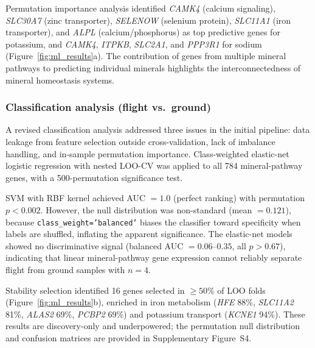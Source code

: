 \documentclass[11pt,a4paper]{article}
\begin{document}
Permutation importance analysis identified \textit{CAMK4} (calcium signaling), \textit{SLC30A7} (zinc transporter), \textit{SELENOW} (selenium protein), \textit{SLC11A1} (iron transporter), and \textit{ALPL} (calcium/phosphorus) as top predictive genes for potassium, and \textit{CAMK4}, \textit{ITPKB}, \textit{SLC2A1}, and \textit{PPP3R1} for sodium (Figure~\ref{fig:ml_results}a). The contribution of genes from multiple mineral pathways to predicting individual minerals highlights the interconnectedness of mineral homeostasis systems.

\subsubsection{Classification analysis (flight vs.\ ground)}

A revised classification analysis addressed three issues in the initial pipeline: data leakage from feature selection outside cross-validation, lack of imbalance handling, and in-sample permutation importance. Class-weighted elastic-net logistic regression with nested LOO-CV was applied to all 784 mineral-pathway genes, with a 500-permutation significance test.

SVM with RBF kernel achieved AUC $= 1.0$ (perfect ranking) with permutation $p < 0.002$. However, the null distribution was non-standard (mean $= 0.121$), because \texttt{class\_weight='balanced'} biases the classifier toward specificity when labels are shuffled, inflating the apparent significance. The elastic-net models showed no discriminative signal (balanced AUC $= 0.06$--$0.35$, all $p > 0.67$), indicating that linear mineral-pathway gene expression cannot reliably separate flight from ground samples with $n = 4$.

Stability selection identified 16 genes selected in $\geq 50\%$ of LOO folds (Figure~\ref{fig:ml_results}b), enriched in iron metabolism (\textit{HFE} 88\%, \textit{SLC11A2} 81\%, \textit{ALAS2} 69\%, \textit{PCBP2} 69\%) and potassium transport (\textit{KCNE1} 94\%). These results are discovery-only and underpowered; the permutation null distribution and confusion matrices are provided in Supplementary Figure~S4.
\end{document}
